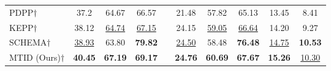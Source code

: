 \begin{table}[t]
{\begin{tabular}{lccccccccc}
{PDPP$\dagger$ }             &   37.2 & 64.67 &  66.57  &  &  21.48 &  57.82 &  65.13 &  13.45 &  8.41 \\
{KEPP$\dagger$ }             &   38.12 & \underline{64.74} &  \underline{67.15}  &  &  24.15 &  \underline{59.05} &  \underline{66.64} &  14.20 &  9.27 \\
{SCHEMA$\dagger$}             &   \underline{38.93} & 63.80 & \bf \color{gray}79.82 &  &  \underline{24.50} &  58.48 &  \bf \color{gray}76.48 &  \underline{14.75} & \bf  10.53 \\
\midrule
{MTID (Ours)$\dagger$}             &   \bf 40.45 & \bf 67.19 & \bf 69.17  &  & \bf 24.76 & \bf 60.69 &  \bf 67.67 & \bf 15.26 & \underline{10.30} \\
\bottomrule
\end{tabular}
}

\label{tab:crosstask}
\end{table}
